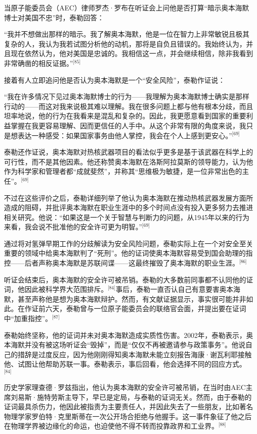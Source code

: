 当原子能委员会（AEC）律师罗杰·罗布在听证会上问他是否打算“暗示奥本海默博士对美国不忠”时，泰勒回答：

“我并不想做出那样的暗示。我了解奥本海默，他是一位在智力上非常敏锐且极其复杂的人，我认为我若试图分析他的动机，那将是自负且错误的。我始终认为，并且现在依然认为，他对美国是忠诚的。我相信这一点，并会继续相信，除非我看到非常确凿的相反证据。”\(^\text{[85]}\)

接着有人立即追问他是否认为奥本海默是一个“安全风险”，泰勒作证说：

“我在许多情况下见过奥本海默博士的行为——我理解为奥本海默博士确实是那样行动的——而这对我来说极其难以理解。我在很多问题上都与他有根本分歧，而且坦率地说，他的行为在我看来是混乱和复杂的。因此，我更愿意看到国家的重要利益掌握在我更容易理解、因而更信任的人手中。从这个非常有限的角度来说，我只是想表达一种感受：如果国家事务由他人掌控，我会在个人上感到更安心。”\(^\text{[69]}\)

泰勒还作证说，奥本海默对热核武器项目的看法似乎更多是基于该武器在科学上的可行性，而不是其他因素。他还称赞奥本海默在洛斯阿拉莫斯的领导能力，认为他作为科学家和管理者都“成就斐然”，并称其“思维极为敏捷，是一位非常出色的主任”。\(^\text{[69]}\)

不过在这些评价之后，泰勒详细列举了他认为奥本海默在推动热核武器发展方面所造成的阻碍，并批评奥本海默在职业生涯中的多个时间点没有投入更多努力去推进相关研究。他说：“如果这是一个关于智慧与判断力的问题，从1945年以来的行为来看，我会说不批准他的安全许可更为明智。”\(^\text{[69]}\)

通过将对氢弹早期工作的分歧解读为安全风险问题，泰勒实际上在一个对安全至关重要的领域中给奥本海默判了“死刑”。他的证词使奥本海默容易受到国会助理的指控——后者声称奥本海默是苏联间谍——这最终摧毁了奥本海默的职业生涯。\(^\text{[86]}\)

听证会结束后，奥本海默的安全许可被吊销。泰勒的大多数前同事都不认同他的证词，他因此被科学界大范围排斥。\(^\text{[84]}\)事后，泰勒一直否认自己有意要害奥本海默，甚至声称他是想为奥本海默辩护。然而，有文献证据显示，事实很可能并非如此。在作证前六天，泰勒曾与一位原子能委员会的联络官会面，并提出要在证词中“加重指控”。\(^\text{[87]}\)

泰勒始终坚称，他的证词并未对奥本海默造成实质性伤害。2002年，泰勒表示，奥本海默并没有被这场听证会“毁掉”，而是“仅仅不再被邀请参与政策事务”。他说自己的措辞是过度反应，因为他刚刚得知奥本海默未能立刻报告海康·谢瓦利耶接触他、试图让他帮助苏联一事。泰勒表示，事后回看，他会选择不同的回应方式。\(^\text{[84]}\)

历史学家理查德·罗兹指出，他认为奥本海默的安全许可被吊销，在当时由AEC主席刘易斯·施特劳斯主导下，早已是定局，与泰勒的证词无关。然而，由于泰勒的证词最具杀伤力，他因此被指责为主要责任人，并因此失去了一些朋友，比如著名物理学家罗伯特·克里斯蒂在一次公开场合拒绝与他握手。这一事件象征了他之后在物理学界被边缘化的命运，也迫使他不得不转而投靠政界和工业界。\(^\text{[88]}\)
